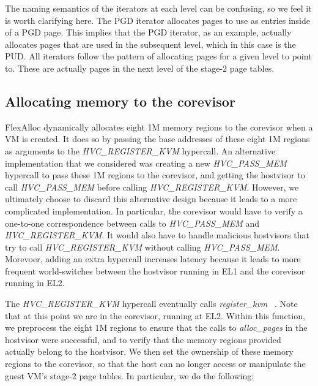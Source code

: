 The naming semantics of the iterators at each level can be confusing, so we feel it is worth
clarifying here. The PGD iterator allocates pages to use as entries inside of a PGD page. This
implies that the PGD iterator, as an example, actually allocates pages that are used in the
subsequent level, which in this case is the PUD. All iterators follow the pattern of allocating
pages for a given level to point to. These are actually pages in the next level
of the stage-2 page tables.

\subsection{Allocating memory to the corevisor}

FlexAlloc dynamically allocates eight 1M memory regions to the corevisor when a
VM is created. It does so by passing the base addresses of these eight 1M
regions as arguments to the \textit{HVC\_REGISTER\_KVM} hypercall. An alternative
implementation that we considered was creating a new \textit{HVC\_PASS\_MEM} hypercall to pass these
1M regions to the corevisor, and getting the hostvisor to call \textit{HVC\_PASS\_MEM}
before calling \textit{HVC\_REGISTER\_KVM}. However, we ultimately choose to
discard this alternative design because it leads to a more complicated
implementation. In particular, the corevisor would have to verify a one-to-one
correspondence between calls to \textit{HVC\_PASS\_MEM} and \textit{HVC\_REGISTER\_KVM}.
It would also have to handle malicious hostvisors that try to call
\textit{HVC\_REGISTER\_KVM} without calling \textit{HVC\_PASS\_MEM}. Morevoer,
adding an extra hypercall increases latency because it leads to more frequent
world-switches between the hostvisor running in EL1 and the corevisor running in EL2.

The \textit{HVC\_REGISTER\_KVM} hypercall eventually calls \textit{register\_kvm}
~\cite{el2.c}. Note that at this point we are in the corevisor, running at EL2.
Within this function, we preprocess the eight 1M regions to ensure that the
calls to \textit{alloc\_pages} in the hostvisor were successful, and to verify
that the memory regions provided actually belong to the hostvisor. We then set
the ownership of these memory regions to the corevisor, so that the host can
no longer access or manipulate the guest VM's stage-2 page tables. In particular,
we do the following:

